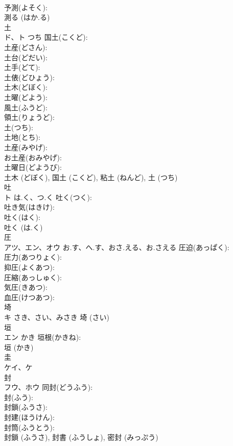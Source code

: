 \documentclass[8pt]{extreport}
\begin{document}
\begin{CJK}{UTF8}{min}
\\	予測(よそく): 
\\	測る (はか.る)
\\	土			
\\	ド、ト	つち	国土(こくど): 
\\	土産(どさん): 
\\	土台(どだい): 
\\	土手(どて): 
\\	土俵(どひょう): 
\\	土木(どぼく): 
\\	土曜(どよう): 
\\	風土(ふうど): 
\\	領土(りょうど): 
\\	土(つち): 
\\	土地(とち): 
\\	土産(みやげ): 
\\	お土産(おみやげ): 
\\	土曜日(どようび): 
\\	土木 (どぼく), 国土 (こくど), 粘土 (ねんど), 土 (つち)
\\	吐			
\\	ト	は.く、つ.く	吐く(つく): 
\\	吐き気(はきけ): 
\\	吐く(はく): 
\\	吐く (は.く)
\\	圧			
\\	アツ、エン、オウ	お.す、へ.す、おさ.える、お.さえる	圧迫(あっぱく): 
\\	圧力(あつりょく): 
\\	抑圧(よくあつ): 
\\	圧縮(あっしゅく): 
\\	気圧(きあつ): 
\\	血圧(けつあつ): 
\\	埼			
\\	キ	さき、さい、みさき		埼 (さい)
\\	垣			
\\	エン	かき	垣根(かきね): 
\\	垣 (かき)
\\	圭			
\\	ケイ、ケ			
\\	封			
\\	フウ、ホウ		同封(どうふう): 
\\	封(ふう): 
\\	封鎖(ふうさ): 
\\	封建(ほうけん): 
\\	封筒(ふうとう): 
\\	封鎖 (ふうさ), 封書 (ふうしょ), 密封 (みっぷう)

\end{CJK}
\end{document}

